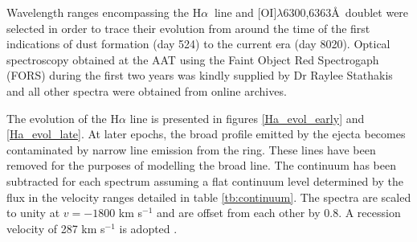 \documentclass[useAMS,usenatbib,usegraphicx]{mnras}
\begin{document}
Wavelength ranges encompassing  the H$\alpha\ $ line and [OI]$\lambda$6300,6363\AA\ doublet  were selected in order to trace their evolution from around the time of the first indications of dust formation (day 524) to the current era (day 8020).  Optical spectroscopy obtained at the AAT using the Faint Object Red Spectrogaph (FORS) during the first two years was kindly supplied by Dr Raylee Stathakis \citep{Spyromilio1991, Spyromilio1993a, Hanuschik1993} and all other spectra were obtained from online archives.  

The evolution of the H$\alpha$ line is presented in figures \ref{Ha_evol_early} and \ref{Ha_evol_late}.  At later epochs, the broad profile emitted by the ejecta becomes contaminated by narrow line emission from the ring.  These lines have been removed for the purposes of modelling the broad line.  The continuum has been subtracted for each spectrum assuming a flat continuum level determined by the flux in the velocity ranges detailed in table \ref{tb:continuum}.  The spectra are scaled to unity at $v=-1800$ km s$^{-1}$ and are offset from each other by 0.8.  A recession velocity of 287 km s$^{-1}$ is adopted \citep{Groningsson2008}.
\end{document}
